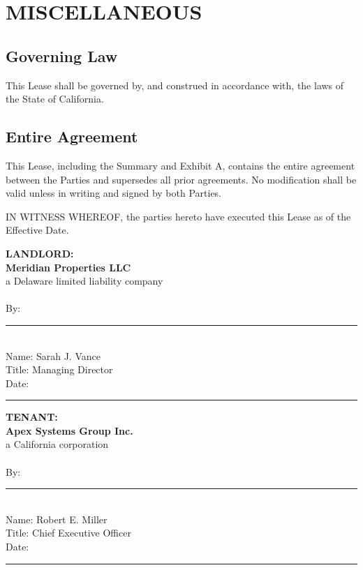 \section{MISCELLANEOUS}
\subsection{Governing Law}
This Lease shall be governed by, and construed in accordance with, the laws of the State of California.

\subsection{Entire Agreement}
This Lease, including the Summary and Exhibit A, contains the entire agreement between the Parties and supersedes all prior agreements. No modification shall be valid unless in writing and signed by both Parties.

\vspace{35pt}

\noindent IN WITNESS WHEREOF, the parties hereto have executed this Lease as of the Effective Date.

\vspace{25pt}
\noindent
\begin{minipage}[t]{0.45\textwidth}
    \textbf{LANDLORD:} \\
    \textbf{Meridian Properties LLC} \\
    a Delaware limited liability company \\
    \vspace{35pt} \\
    By: \rule{1.8in}{0.5pt} \\
    Name: Sarah J. Vance \\
    Title: Managing Director \\
    Date: \rule{1.8in}{0.5pt}
\end{minipage}
\hfill
\begin{minipage}[t]{0.45\textwidth}
    \textbf{TENANT:} \\
    \textbf{Apex Systems Group Inc.} \\
    a California corporation \\
    \vspace{35pt} \\
    By: \rule{1.8in}{0.5pt} \\
    Name: Robert E. Miller \\
    Title: Chief Executive Officer \\
    Date: \rule{1.8in}{0.5pt}
\end{minipage}

\clearpage
\pagestyle{fancy}
